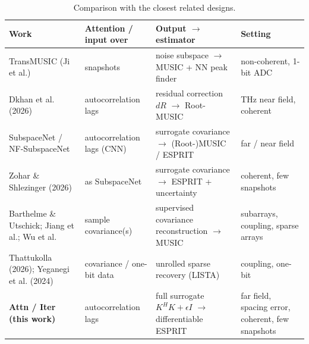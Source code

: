 \begin{table}[h!]
\centering
\small
\caption{Comparison with the closest related designs.}
\label{tab:positioning}
\begin{tabular}{>{\raggedright}p{3.9cm}>{\raggedright}p{2.6cm}>{\raggedright}p{4.6cm}>{\raggedright\arraybackslash}p{3.6cm}}
\toprule
Work & Attention / input over & Output $\to$ estimator & Setting \\
\midrule
TransMUSIC (Ji et al.) & snapshots & noise subspace $\to$ MUSIC + NN peak finder & non-coherent, 1-bit ADC \\
Dkhan et al. (2026) & autocorrelation lags & residual correction $dR$ $\to$ Root-MUSIC & THz near field, coherent \\
SubspaceNet / NF-SubspaceNet & autocorrelation lags (CNN) & surrogate covariance $\to$ (Root-)MUSIC / ESPRIT & far / near field \\
Zohar \& Shlezinger (2026) & as SubspaceNet & surrogate covariance $\to$ ESPRIT + uncertainty & coherent, few snapshots \\
Barthelme \& Utschick; Jiang et al.; Wu et al. & sample covariance(s) & supervised covariance reconstruction $\to$ MUSIC & subarrays, coupling, sparse arrays \\
Thattukolla (2026); Yeganegi et al. (2024) & covariance / one-bit data & unrolled sparse recovery (LISTA) & coupling, one-bit \\
\textbf{Attn / Iter (this work)} & autocorrelation lags & full surrogate $K^HK+\epsilon I$ $\to$ differentiable ESPRIT & far field, spacing error, coherent, few snapshots \\
\hline
\end{tabular}
\end{table}
